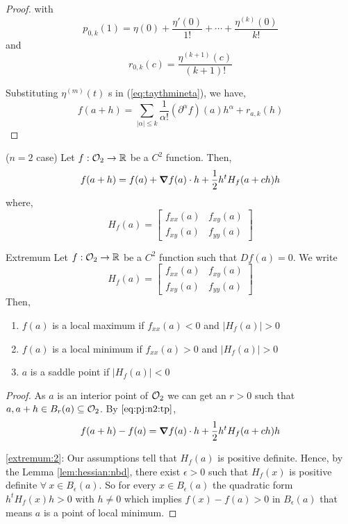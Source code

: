 \documentclass[../Analysis-3.tex]{subfiles}
\begin{document}
\begin{proof}
  with \begin{equation}
    p_{0,k}(1) = \eta(0) + \frac{\eta '(0)}{1!} + \cdots + \frac{\eta^{(k)}(0)}{k!}
  \end{equation} and
  \begin{equation}
    r_{0,k} (c) = \frac{\eta^{(k+1)}(c)}{(k+1)!}
  \end{equation}

  Substituting $\eta^{(m)}(t)$ s in (\ref{eq:taythmineta}), we have,
  \[ f(a+h) = \sum_{| \alpha | \leq k } \frac{1}{\alpha !} ({\partial}^{\alpha} f ) (a) h^{\alpha} + r_{a,k} (h) \]
\end{proof}

\begin{noteBox}
  ($n=2$ case) Let $f : \mathcal{O}_{2} \to \mathbb{R}$ be a $C^2$ function. Then,
  \begin{equation}\label{eq:pj:n2:tp}
    f(a+h) = f(a) + \grad f(a)\cdot h + \frac{1}{2}h^t H_f(a+ch)h
  \end{equation} where,
  \[ H_f(a) = \begin{bmatrix}
      f_{xx}(a) & f_{xy}(a) \\
      f_{xy}(a) & f_{yy}(a)
    \end{bmatrix} \]
\end{noteBox}

\begin{Thm}{Extremum}{}
  Let $f : \mathcal{O}_{2} \to \mathbb{R}$ be a $C^2$ function such that $Df(a) = 0$. We write \[ H_f(a) =  \begin{bmatrix}
      f_{xx}(a) & f_{xy}(a) \\
      f_{xy}(a) & f_{yy}(a)
    \end{bmatrix} \]
  Then, \begin{enumerate}[label=(\roman*)]
    \item $f(a)$ is a local maximum if $f_{xx} (a) < 0$ and $|H_f(a)| > 0$
    \item $f(a)$ is a local minimum if $f_{xx} (a) > 0$ and $|H_f(a)| > 0$ \label{extremum:2}
    \item $a$ is a saddle point if $|H_f(a)| < 0$
  \end{enumerate}
\end{Thm}

\begin{proof}
  As $ a $ is an interior point of $ \mathcal{O}_{2} $ we can get an $ r > 0 $ such that $ a, a+h \in B_r(a) \subseteq \mathcal{O}_{2}$. By $\eqref{eq:pj:n2:tp}$, \[ f(a+h) - f(a) = \grad f(a) \cdot h + \frac{1}{2}h^t H_f(a+ch)h \]

  \ref{extremum:2}: Our assumptions tell that $H_f(a)$ is positive definite. Hence, by the Lemma \ref{lem:hessian:nbd}, there exist $ \epsilon > 0 $ such that $H_f(x)$ is positive definite $\forall\ x \in B_{\epsilon}(a)$. So for every $ x \in B_{\epsilon}(a) $ the quadratic form $ h^t H_f(x) h > 0 $ with $ h \neq 0 $ which implies $ f(x) - f(a) > 0 $ in $ B_{\epsilon}(a) $ that means $a$ is a point of local minimum.

\end{proof}
\end{document}
